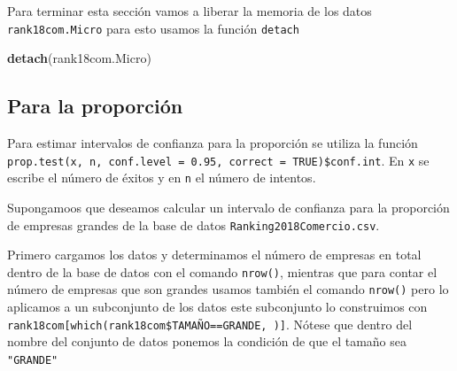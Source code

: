 \documentclass[letterpaper,]{book}
\newenvironment{Shaded}{\begin{snugshade}}{\end{snugshade}}
\newcommand{\DataTypeTok}[1]{\textcolor[rgb]{0.13,0.29,0.53}{#1}}
\newcommand{\KeywordTok}[1]{\textcolor[rgb]{0.13,0.29,0.53}{\textbf{#1}}}
\newcommand{\NormalTok}[1]{#1}
\newcommand{\OperatorTok}[1]{\textcolor[rgb]{0.81,0.36,0.00}{\textbf{#1}}}
\newcommand{\OtherTok}[1]{\textcolor[rgb]{0.56,0.35,0.01}{#1}}
\newcommand{\StringTok}[1]{\textcolor[rgb]{0.31,0.60,0.02}{#1}}
\begin{document}
Para terminar esta sección vamos a liberar la memoria de los datos \texttt{rank18com.Micro} para esto usamos la función \texttt{detach}

\begin{Shaded}
\begin{Highlighting}[]
\KeywordTok{detach}\NormalTok{(rank18com.Micro)}
\end{Highlighting}
\end{Shaded}

\hypertarget{para-la-proporcion}{%
\subsection{Para la proporción}\label{para-la-proporcion}}

Para estimar intervalos de confianza para la proporción se utiliza la función \texttt{prop.test(x,\ n,\ conf.level\ =\ 0.95,\ correct\ =\ TRUE)\$conf.int}. En \texttt{x} se escribe el número de éxitos y en \texttt{n} el número de intentos.

Supongamoos que deseamos calcular un intervalo de confianza para la proporción de empresas grandes de la base de datos \texttt{Ranking2018Comercio.csv}.

Primero cargamos los datos y determinamos el número de empresas en total dentro de la base de datos con el comando \texttt{nrow()}, mientras que para contar el número de empresas que son grandes usamos también el comando \texttt{nrow()} pero lo aplicamos a un subconjunto de los datos este subconjunto lo construimos con \texttt{rank18com{[}which(rank18com\$TAMAÑO==\textquotesingle{}GRANDE\textquotesingle{},\ ){]}}. Nótese que dentro del nombre del conjunto de datos ponemos la condición de que el tamaño sea \texttt{"GRANDE"}

\begin{Shaded}
\end{Shaded}
\end{document}
